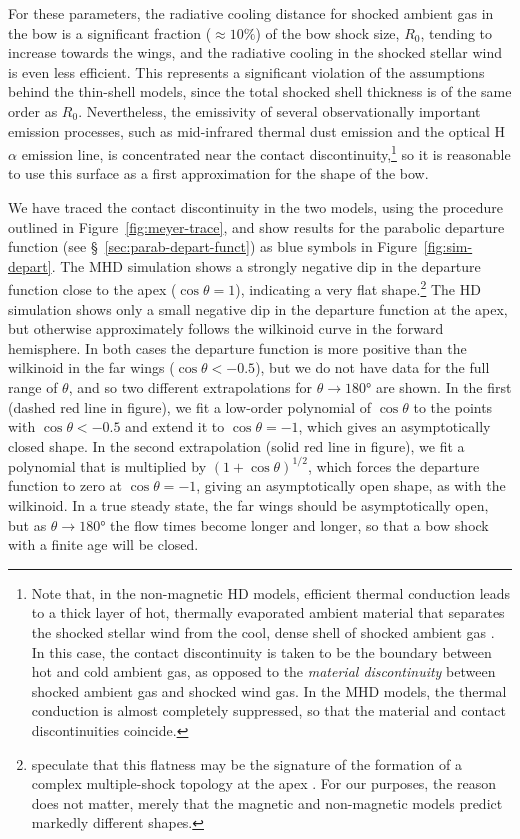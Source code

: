 \documentclass[useAMS, usenatbib, a4paper]{mnras}
\begin{document}
For these parameters, the radiative cooling distance for shocked
ambient gas in the bow is a significant fraction (\(\approx 10\%\)) of the
bow shock size, \(R_0\), tending to increase towards the wings, and
the radiative cooling in the shocked stellar wind is even less
efficient.  This represents a significant violation of the assumptions
behind the thin-shell models, since the total shocked shell thickness
is of the same order as \(R_0\).  Nevertheless, the emissivity of
several observationally important emission processes, such as
mid-infrared thermal dust emission and the optical H\(\alpha\) emission
line, is concentrated near the contact discontinuity,\footnote{%
  Note that, in the non-magnetic HD models, efficient thermal
  conduction leads to a thick layer of hot, thermally evaporated
  ambient material that separates the shocked stellar wind from the
  cool, dense shell of shocked ambient gas \citep[see \S~3.3
  of][]{Meyer:2014b}.  In this case, the contact discontinuity is
  taken to be the boundary between hot and cold ambient gas, as
  opposed to the \textit{material discontinuity} between shocked
  ambient gas and shocked wind gas.  In the MHD models, the thermal
  conduction is almost completely suppressed, so that the material and
  contact discontinuities coincide. } %
so it is reasonable to use this surface as a first approximation for
the shape of the bow.

We have traced the contact discontinuity in the two models, using the
procedure outlined in Figure~\ref{fig:meyer-trace}, and show results
for the parabolic departure function (see
\S~\ref{sec:parab-depart-funct}) as blue symbols in
Figure~\ref{fig:sim-depart}.  The MHD simulation shows a strongly
negative dip in the departure function close to the apex
(\(\cos \theta = 1\)), indicating a very flat shape.\footnote{%
  \citet{Meyer:2017a} speculate that this flatness may be the
  signature of the formation of a complex multiple-shock topology at
  the apex \citep{de-Sterck:1999a}.  For our purposes, the reason does
  not matter, merely that the magnetic and non-magnetic models predict
  markedly different shapes. } %
The HD simulation shows only a small negative dip in the departure
function at the apex, but otherwise approximately follows the
wilkinoid curve in the forward hemisphere.  In both cases the
departure function is more positive than the wilkinoid in the far
wings (\(\cos \theta < -0.5\)), but we do not have data for the full range
of \(\theta\), and so two different extrapolations for
\(\theta \to \ang{180}\) are shown.  In the first (dashed red line in
figure), we fit a low-order polynomial of \(\cos \theta\) to the points
with \(\cos \theta < -0.5\) and extend it to \(\cos \theta = -1\), which gives
an asymptotically closed shape.  In the second extrapolation (solid
red line in figure), we fit a polynomial that is multiplied by
\((1 + \cos\theta)^{1/2}\), which forces the departure function to zero at
\(\cos \theta = -1\), giving an asymptotically open shape, as with the
wilkinoid.  In a true steady state, the far wings should be
asymptotically open, but as \(\theta \to \ang{180}\) the flow times become
longer and longer, so that a bow shock with a finite age will be
closed.
\end{document}
